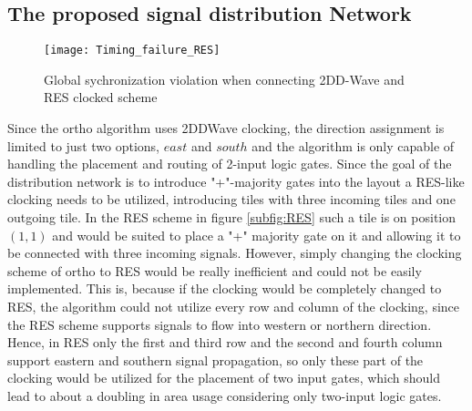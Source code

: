 \subsection{The proposed signal distribution Network}

\begin{figure}
	\centering
	\texttt{[image: Timing\_failure\_RES]}
	\caption{Global sychronization violation when connecting 2DD-Wave and RES clocked scheme}\label{fig:Timing_failure_RES}
\end{figure}

Since the ortho algorithm uses 2DDWave clocking, the direction assignment is limited to just two options, $east$ and $south$ and the algorithm is only capable of handling the placement and routing of 2-input logic gates. Since the goal of the distribution network is to introduce "+"-majority gates into the layout a RES-like clocking needs to be utilized, introducing tiles with three incoming tiles and one outgoing tile. In the RES scheme in figure \ref{subfig:RES} such a tile is on position $(1, 1)$ and would be suited to place a "+" majority gate on it and allowing it to be connected with three incoming signals. However, simply changing the clocking scheme of ortho to RES would be really inefficient and could not be easily implemented. This is, because if the clocking would be completely changed to RES, the algorithm could not utilize every row and column of the clocking, since the RES scheme supports signals to flow into western or northern direction. Hence, in RES only the first and third row and the second and fourth column support eastern and southern signal propagation, so only these part of the clocking would be utilized for the placement of two input gates, which should lead to about a doubling in area usage considering only two-input logic gates. 
